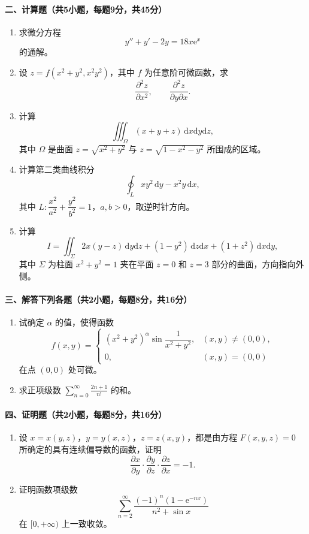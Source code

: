 \paragraph*{二、计算题（共5小题，每题9分，共45分）}
\begin{enumerate}
  \item 求微分方程
  \[
    y''+y'-2y=18x\mathrm{e}^x
  \]
  的通解。

  \item 设 \(z=f(x^2+y^2,x^2y^2)\)，其中 \(f\) 为任意阶可微函数，求
  \[
    \frac{\partial^2z}{\partial x^2},\qquad
    \frac{\partial^2z}{\partial y\partial x}.
  \]

  \item 计算
  \[
    \iiint_\Omega (x+y+z)\,\mathrm{d}x\mathrm{d}y\mathrm{d}z,
  \]
  其中 \(\Omega\) 是曲面 \(z=\sqrt{x^2+y^2}\) 与 \(z=\sqrt{1-x^2-y^2}\) 所围成的区域。

  \item 计算第二类曲线积分
  \[
    \oint_L xy^2\,\mathrm{d}y-x^2y\,\mathrm{d}x,
  \]
  其中 \(L:\dfrac{x^2}{a^2}+\dfrac{y^2}{b^2}=1\)，\(a,b>0\)，取逆时针方向。

  \item 计算
  \[
    I=\iint_\Sigma 2x(y-z)\,\mathrm{d}y\mathrm{d}z+(1-y^2)\,\mathrm{d}z\mathrm{d}x+(1+z^2)\,\mathrm{d}x\mathrm{d}y,
  \]
  其中 \(\Sigma\) 为柱面 \(x^2+y^2=1\) 夹在平面 \(z=0\) 和 \(z=3\) 部分的曲面，方向指向外侧。
\end{enumerate}

\paragraph*{三、解答下列各题（共2小题，每题8分，共16分）}
\begin{enumerate}
  \item 试确定 \(\alpha\) 的值，使得函数
  \[
    f(x,y)=
    \begin{cases}
      (x^2+y^2)^\alpha\sin\dfrac1{x^2+y^2}, & (x,y)\ne(0,0),\\
      0, & (x,y)=(0,0)
    \end{cases}
  \]
  在点 \((0,0)\) 处可微。
  \item 求正项级数 \(\displaystyle \sum_{n=0}^{\infty}\frac{2n+1}{n!}\) 的和。
\end{enumerate}

\paragraph*{四、证明题（共2小题，每题8分，共16分）}
\begin{enumerate}
  \item 设 \(x=x(y,z)\)，\(y=y(x,z)\)，\(z=z(x,y)\)，都是由方程 \(F(x,y,z)=0\) 所确定的具有连续偏导数的函数，证明
  \[
    \frac{\partial x}{\partial y}\cdot
    \frac{\partial y}{\partial z}\cdot
    \frac{\partial z}{\partial x}=-1.
  \]
  \item 证明函数项级数
  \[
    \sum_{n=2}^{\infty}\frac{(-1)^n(1-\mathrm{e}^{-nx})}{n^2+\sin x}
  \]
  在 \([0,+\infty)\) 上一致收敛。
\end{enumerate}

